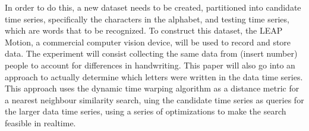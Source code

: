  In order to do this, a new dataset needs to be created, partitioned into candidate time series, specifically the characters in the alphabet, and testing time series, which are words that to be recognized. To construct this dataset, the LEAP Motion, a commercial computer vision device, will be used to record and store data. The experiment will consist collecting the same data from  (insert number) people to account for differences in handwriting. This paper will also go into an approach to actually determine which letters were written in the data time series. This approach uses the dynamic time warping algorithm as a distance metric for a nearest neighbour similarity search, uing the candidate time series as queries for the larger data time series, using a series of optimizations to make the search feasible in realtime.
